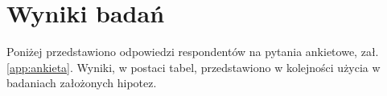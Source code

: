 \documentclass[a4paper,12pt,twoside,openright]{mwrep}
\begin{document}
\chapter*{Wyniki badań}

	Poniżej przedstawiono odpowiedzi respondentów na pytania ankietowe, zał. \ref{app:ankieta}. 
	Wyniki, w postaci tabel, przedstawiono w kolejności użycia w badaniach założonych hipotez.
	
\vspace{\baselineskip} 






































\end{document}
